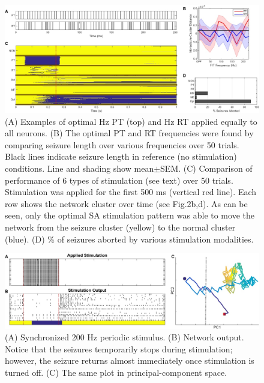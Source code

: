 \documentclass[11pt,a4paper,final]{article}
\begin{document}
\begin{figure}[!ht]
	\centering
	\includegraphics[width=180mm]{MC}
	\caption[Simulated Annealing Monte Carlo Analysis]{
		(A) Examples of optimal \fit{}Hz PT (top) and \rit{}Hz RT applied equally to all \nn{} neurons.
		(B) The optimal PT and RT frequencies were found by comparing seizure length over various frequencies over 50 trials. Black lines indicate seizure length in reference (no stimulation) conditions. Line and shading show mean$\pm$SEM.
		(C) Comparison of performance of 6 types of stimulation (see text) over 50 trials. Stimulation was applied for the first 500 ms (vertical red line). Each row shows the network cluster over time (see Fig.2b,d). As can be seen, only the optimal SA stimulation pattern was able to move the network from the seizure cluster (yellow) to the normal cluster (blue).
		(D) \% of seizures aborted by various stimulation modalities.
	}
	\label{MC}
\end{figure}

\begin{figure}[!ht]
	\centering
	\includegraphics[width=180mm]{FITstim}
	\caption[Periodic Stimulation]{
		(A) Synchronized 200 Hz periodic stimulus.
		(B) Network output. Notice that the seizures temporarily stops during stimulation; however, the seizure returns almost immediately once stimulation is turned off.
		(C) The same plot in principal-component space.}
	\label{FITstim}
\end{figure}
\end{document}
